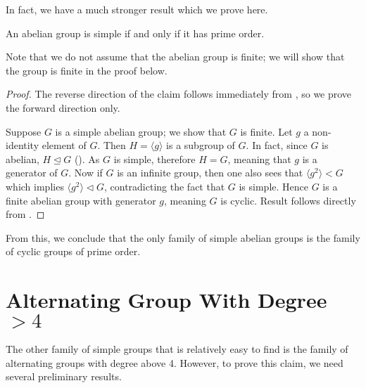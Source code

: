 In fact, we have a much stronger result which we prove here.
\begin{theorem}\label{thrm-abelian-group-simple-iff-cylic-group-of-prime-order}
    An abelian group is simple if and only if it has prime order.
\end{theorem}
Note that we do not assume that the abelian group is finite; we will show that the group is finite in the proof below.
\begin{proof}
    The reverse direction of the claim follows immediately from , so we prove the forward direction only.

    Suppose $G$ is a simple abelian group; we show that $G$ is finite. Let $g$ a non-identity element of $G$. Then $H = \langle g \rangle$ is a subgroup of $G$. In fact, since $G$ is abelian, $H \unlhd G$ (). As $G$ is simple, therefore $H = G$, meaning that $g$ is a generator of $G$. Now if $G$ is an infinite group, then one also sees that $\langle g^2 \rangle < G$ which implies $\langle g^2 \rangle \lhd G$, contradicting the fact that $G$ is simple. Hence $G$ is a finite abelian group with generator $g$, meaning $G$ is cyclic. Result follows directly from .
\end{proof}

From this, we conclude that the only family of simple abelian groups is the family of cyclic groups of prime order.

\section{Alternating Group With Degree $>4$}
The other family of simple groups that is relatively easy to find is the family of alternating groups with degree above 4. However, to prove this claim, we need several preliminary results.

